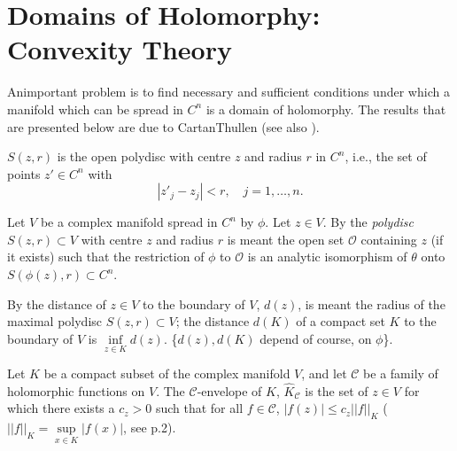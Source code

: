 
\chapter{Domains of Holomorphy: Convexity Theory}\label{chap6}

An\pageoriginale important problem is to find necessary and sufficient
conditions under which a manifold which can be spread in $C^n$ is a
domain of holomorphy. The results that are presented below are due to
CartanThullen \cite{p1:key2} (see also \cite{p1:key1}).

$S(z,r)$ is the open polydisc with centre $z$ and radius $r$ in $C^n$,
i.e., the set of points $z' \in C^n$ with 
$$
|z'_j - z_j| < r, \quad j = 1, \ldots, n.
$$

\setcounter{defn}{0}
\begin{defn}\label{chap6:def1}
Let $V$ be a complex manifold spread in $C^n$ by $\phi$. Let $z \in
V$. By the \textit{polydisc} $S(z, r) \subset V$ with centre $z$ and
radius $r$ is meant the open set $\mathscr{O}$ containing $z$ (if it
exists) such that the restriction of $\phi$ to $\mathscr{O}$ is an
analytic isomorphism of $\theta$ onto $S(\phi(z), r) \subset C^n$.

By the distance of $z \in V$ to the boundary of $V$, $d(z)$, is meant
the radius of the maximal polydisc $S(z, r) \subset V$; the distance
$d(K)$ of a compact set $K$ to the boundary of $V$ is
$\inf\limits_{z\in K} d(z)$. \{$d(z), d(K)$ depend of course, on
$\phi$\}. 
\end{defn}

\begin{defi*}
Let $K$ be a compact subset of the complex manifold $V$, and let
$\mathscr{C}$ be a family of holomorphic functions on $V$. The
$\mathscr{C}$-envelope of $K$, $\hat{K}_\mathscr{C}$ is the set of $z
\in V$ for which there exists a $c_z > 0$ such that for all $f\in
\mathscr{C}$, $|f(z)| \leq c_z ||f||_K $ ($||f||_K = \sup\limits_{x
  \in K} |f(x)|$, see p.2). 
\end{defi*}


